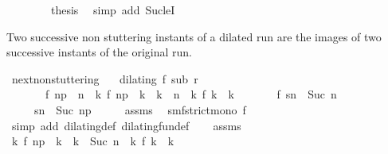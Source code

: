 \begin{isabellebody}
\ \ \isamarkupfalse%
\isanewline
\ \ \isamarkupfalse%
\ \isamarkupfalse%
\ {\isacharquery}thesis\ \isamarkupfalse%
\ {\isacharparenleft}simp\ add{\isacharcolon}\ Suc{\isacharunderscore}leI{\isacharparenright}\isanewline
{}\isamarkupfalse%
%
\endisatagproof
{\isafoldproof}%
%
\isadelimproof
%
\endisadelimproof
%
\begin{isamarkuptext}%
Two successive non stuttering instants of a dilated run are the images
  of two successive instants of the original run.%
\end{isamarkuptext}\isamarkuptrue%
\isamarkupfalse%
\ next{\isacharunderscore}non{\isacharunderscore}stuttering{\isacharcolon}\isanewline
\ \ \ {\isacartoucheopen}dilating\ f\ sub\ r{\isacartoucheclose}\isanewline
\ \ \ \ \ \ \ {\isacartoucheopen}f\ n\isactrlsub p\ {\isacharless}\ n\ {\isasymand}\ {\isacharparenleft}{\isasymforall}k{\isachardot}\ f\ n\isactrlsub p\ {\isacharless}\ k\ {\isasymand}\ k\ {\isasymle}\ n\ {\isasymlongrightarrow}\ {\isacharparenleft}{\isasymnexists}k\ f\ k\ {\isacharequal}\ k{\isacharparenright}{\isacharparenright}{\isacartoucheclose}\isanewline
\ \ \ \ \ \ \ {\isacartoucheopen}f\ sn\ {\isacharequal}\ Suc\ n{\isacartoucheclose}\isanewline
\ \ \ \ \ {\isacartoucheopen}sn\ {\isacharequal}\ Suc\ n\isactrlsub p{\isacartoucheclose}\isanewline
%
\isadelimproof
%
\endisadelimproof
%
\isatagproof
{}\isamarkupfalse%
\ {\isacharminus}\isanewline
\ \ \isamarkupfalse%
\ assms{\isacharparenleft}{}{\isacharparenright}\ \isamarkupfalse%
\ smf{\isacharcolon}{\isacartoucheopen}strict{\isacharunderscore}mono\ f{\isacartoucheclose}\ \isamarkupfalse%
\ {\isacharparenleft}simp\ add{\isacharcolon}\ dilating{\isacharunderscore}def\ dilating{\isacharunderscore}fun{\isacharunderscore}def{\isacharparenright}\isanewline
\ \ \isamarkupfalse%
\ assms{\isacharparenleft}{}{\isacharparenright}\ \isamarkupfalse%
\ {\isacharasterisk}{\isacharcolon}{\isacartoucheopen}{\isasymforall}k{\isachardot}\ f\ n\isactrlsub p\ {\isacharless}\ k\ {\isasymand}\ k\ {\isacharless}\ Suc\ n\ {\isasymlongrightarrow}\ {\isacharparenleft}{\isasymnexists}k\ f\ k\ {\isacharequal}\ k{\isacharparenright}{\isacartoucheclose}\ \isamarkupfalse%

\end{isabellebody}
